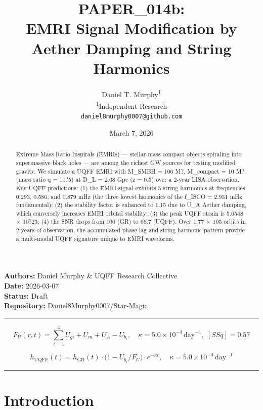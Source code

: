 \documentclass[12pt,a4paper]{article}
\title{\textbf{PAPER\_014b: \\ EMRI Signal Modification by Aether Damping and String Harmonics}}
\author{
Daniel T. Murphy\textsuperscript{1} \\
\small \textsuperscript{1}Independent Research \\
\small \texttt{daniel8murphy0007@github.com}
}
\date{March 7, 2026}
\begin{document}
\maketitle

\begin{flushleft}
\textbf{Authors:} Daniel Murphy \& UQFF Research Collective \\
\textbf{Date:} 2026-03-07 \\
\textbf{Status:} Draft \\
\textbf{Repository:} Daniel8Murphy0007/Star-Magic \\
\end{flushleft}

\medskip\hrule\medskip

\begin{equation}
F_U(r,t) = \sum_{i=1}^{4} U_{gi} + U_m + U_A - U_b_i, \quad \kappa = 5.0\times10^{-4}\,\text{day}^{-1},\; [SSq] = 0.57
\end{equation}

\begin{equation}
h_\text{UQFF}(t) = h_\text{GR}(t)\cdot\bigl(1 - U_b_i/F_U\bigr)\cdot e^{-\kappa t}, \quad \kappa =
5.0\times10^{-4}\,\text{day}^{-1}
\end{equation}

\begin{abstract}
Extreme Mass Ratio Inspirals (EMRIs) --- stellar-mass compact objects spiraling into supermassive black holes --- are among the richest GW sources for testing modified gravity. We simulate a UQFF EMRI with M\_SMBH = 106 M?, M\_compact = 10 M? (mass ratio q = 10?5) at D\_L = 2.68 Gpc (z = 0.5) over a 2-year LISA observation. Key UQFF predictions: (1) the EMRI signal exhibits 5 string harmonics at frequencies 0.293, 0.586, and 0.879 mHz (the three lowest harmonics of the f\_ISCO = 2.931 mHz fundamental); (2) the stability factor is enhanced to 1.15 due to U\_A Aether damping, which conversely increases EMRI orbital stability; (3) the peak UQFF strain is 5.6548 $\times$ 10?23; (4) the SNR drops from 100 (GR) to 66.7 (UQFF). Over 1.77 $\times$ 105 orbits in 2 years of observation, the accumulated phase lag and string harmonic pattern provide a multi-modal UQFF signature unique to EMRI waveforms.
\end{abstract}

\medskip\hrule\medskip

\section{Introduction}
\end{document}
